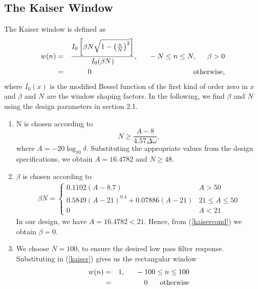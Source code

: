 \documentclass{article}
\begin{document}
\subsection{The Kaiser Window}
The Kaiser window is defined as
\begin{eqnarray}
\label{kaiser}
w(n) &=& \frac{I_0\left[ \beta N \sqrt{1 - \left(\frac{n}{N}\right)^2} \right]}{I_0(\beta N)},
\indent -N \leq n \leq N, \indent \beta > 0 \nonumber \\
&=& 0 \hspace{5cm} \mbox{otherwise,}
\end{eqnarray}
where $I_0(x)$ is the modified Bessel function of the first kind of order zero in $x$ and $\beta$
and $N$ are the window shaping factors.  In the following,
we find $\beta$ and $N$ using the design parameters in section 2.1.

\begin{enumerate}
\item  N is chosen according to
\begin{equation}
N \geq \frac{A-8}{4.57\Delta \omega},
\end{equation}
where $A = -20\log_{10}\delta$.  Substituting the appropriate values from the design specifications, we obtain
$A = 16.4782$ and $N \geq 48$.

\item  $\beta$ is chosen according to
\begin{eqnarray}
\label{kaisercond}
\beta N = \left\{ \begin{array}{ll} 0.1102(A-8.7) & A > 50 \\
0.5849(A-21)^{0.4}+ 0.07886(A-21) & 21 \leq A \leq 50 \\
0 & A < 21\end{array} \right.
\end{eqnarray}
In our design, we have $A = 16.4782 < 21$.  Hence, from (\ref{kaisercond}) we obtain $\beta = 0$.  

\item We choose $N = 100$, to ensure the desired low pass filter response.  Substituting in (\ref{kaiser})
gives us the rectangular window
\begin{eqnarray}
\label{rect}
w(n) &=& 1, \indent -100 \leq n \leq 100 \nonumber \\
&=& 0 \hspace{6mm} \mbox{otherwise}
\end{eqnarray}
\end{enumerate}
\end{document}
